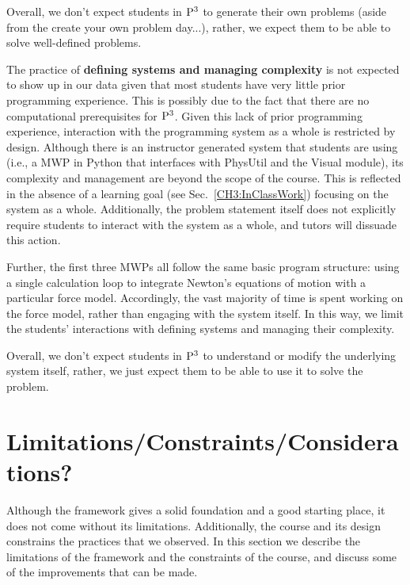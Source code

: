 \documentclass{msuphddissertation}
\begin{document}
\begin{doublespace}
Overall, we don't expect students in ${\rm P}^{3}$ to generate their own problems (aside from the create your own problem day...), rather, we expect them to be able to solve well-defined problems.

The practice of \textbf{defining systems and managing complexity} is not expected to show up in our data given that most students have very little prior programming experience.  This is possibly due to the fact that there are no computational prerequisites for ${\rm P}^{3}$.  Given this lack of prior programming experience, interaction with the programming system as a whole is restricted by design.  Although there is an instructor generated system that students are using (i.e., a MWP in Python that interfaces with PhysUtil and the Visual module), its complexity and management are beyond the scope of the course.  This is reflected in the absence of a learning goal (see Sec.~\ref{CH3:InClassWork}) focusing on the system as a whole.  Additionally, the problem statement itself does not explicitly require students to interact with the system as a whole, and tutors will dissuade this action.

Further, the first three MWPs all follow the same basic program structure: using a single calculation loop to integrate Newton's equations of motion with a particular force model.  Accordingly, the vast majority of time is spent working on the force model, rather than engaging with the system itself.  In this way, we limit the students' interactions with defining systems and managing their complexity.

Overall, we don't expect students in ${\rm P}^{3}$ to understand or modify the underlying system itself, rather, we just expect them to be able to use it to solve the problem.

\section{Limitations/Constraints/Considerations?}

Although the framework gives a solid foundation and a good starting place, it does not come without its limitations.  Additionally, the course and its design constrains the practices that we observed.  In this section we describe the limitations of the framework and the constraints of the course, and discuss some of the improvements that can be made.



\end{doublespace}
\end{document}
